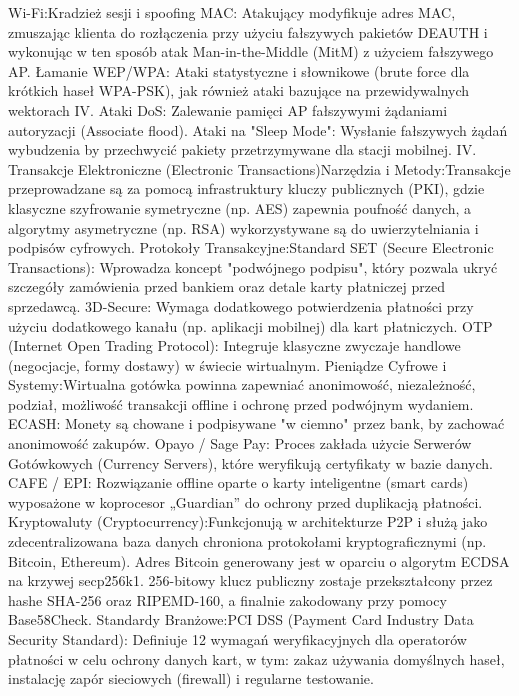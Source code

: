 Wi-Fi:Kradzież sesji i spoofing MAC: Atakujący modyfikuje adres MAC, zmuszając klienta do rozłączenia przy użyciu fałszywych pakietów DEAUTH i wykonując w ten sposób atak Man-in-the-Middle (MitM) z użyciem fałszywego AP.  Łamanie WEP/WPA: Ataki statystyczne i słownikowe (brute force dla krótkich haseł WPA-PSK), jak również ataki bazujące na przewidywalnych wektorach IV.  Ataki DoS: Zalewanie pamięci AP fałszywymi żądaniami autoryzacji (Associate flood).  Ataki na "Sleep Mode": Wysłanie fałszywych żądań wybudzenia by przechwycić pakiety przetrzymywane dla stacji mobilnej.  IV. Transakcje Elektroniczne (Electronic Transactions)Narzędzia i Metody:Transakcje przeprowadzane są za pomocą infrastruktury kluczy publicznych (PKI), gdzie klasyczne szyfrowanie symetryczne (np. AES) zapewnia poufność danych, a algorytmy asymetryczne (np. RSA) wykorzystywane są do uwierzytelniania i podpisów cyfrowych.  Protokoły Transakcyjne:Standard SET (Secure Electronic Transactions): Wprowadza koncept "podwójnego podpisu", który pozwala ukryć szczegóły zamówienia przed bankiem oraz detale karty płatniczej przed sprzedawcą.  3D-Secure: Wymaga dodatkowego potwierdzenia płatności przy użyciu dodatkowego kanału (np. aplikacji mobilnej) dla kart płatniczych.  OTP (Internet Open Trading Protocol): Integruje klasyczne zwyczaje handlowe (negocjacje, formy dostawy) w świecie wirtualnym.  Pieniądze Cyfrowe i Systemy:Wirtualna gotówka powinna zapewniać anonimowość, niezależność, podział, możliwość transakcji offline i ochronę przed podwójnym wydaniem.  ECASH: Monety są chowane i podpisywane "w ciemno" przez bank, by zachować anonimowość zakupów.  Opayo / Sage Pay: Proces zakłada użycie Serwerów Gotówkowych (Currency Servers), które weryfikują certyfikaty w bazie danych.  CAFE / EPI: Rozwiązanie offline oparte o karty inteligentne (smart cards) wyposażone w koprocesor „Guardian” do ochrony przed duplikacją płatności.  Kryptowaluty (Cryptocurrency):Funkcjonują w architekturze P2P i służą jako zdecentralizowana baza danych chroniona protokołami kryptograficznymi (np. Bitcoin, Ethereum).  Adres Bitcoin generowany jest w oparciu o algorytm ECDSA na krzywej secp256k1. 256-bitowy klucz publiczny zostaje przekształcony przez hashe SHA-256 oraz RIPEMD-160, a finalnie zakodowany przy pomocy Base58Check.  Standardy Branżowe:PCI DSS (Payment Card Industry Data Security Standard): Definiuje 12 wymagań weryfikacyjnych dla operatorów płatności w celu ochrony danych kart, w tym: zakaz używania domyślnych haseł, instalację zapór sieciowych (firewall) i regularne testowanie.  


